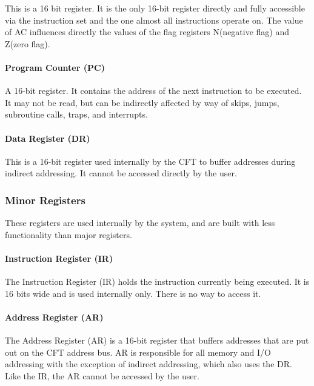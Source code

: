 \documentclass[11pt,a4paper,twocolumns]{article}
\newcommand\register[1]{\textsf{#1}}
\newcommand\A{\register{AC}}
\newcommand\Zreg{\register{Z}}
\newcommand\Nreg{\register{N}}
\newcommand\AR{\register{AR}}
\newcommand\DR{\register{DR}}
\newcommand\PC{\register{PC}}
\newcommand\IR{\register{IR}}
\begin{document}
This is a 16 bit register. It is the only 16-bit register directly and
fully accessible via the instruction set and the one almost all
instructions operate on. The value of \A{} influences directly the
values of the flag registers \Nreg (negative flag) and \Zreg (zero
flag).

\paragraph{Program Counter (\PC)}

A 16-bit register. It contains the address of the next instruction to
be executed. It may not be read, but can be indirectly affected by way
of skips, jumps, subroutine calls, traps, and interrupts.

\paragraph{Data Register (\DR)}

This is a 16-bit register used internally by the CFT to buffer
addresses during indirect addressing. It cannot be accessed directly
by the user.



\subsubsection{Minor Registers}

These registers are used internally by the system, and are built with
less functionality than major registers.

\paragraph{Instruction Register (\IR)}

The Instruction Register (\IR) holds the instruction currently being
executed. It is 16 bits wide and is used internally only. There is no
way to access it.

\paragraph{Address Register (\AR)}

The Address Register (\AR) is a 16-bit register that buffers addresses
that are put out on the CFT address bus. \AR{} is responsible for all
memory and I/O addressing with the exception of indirect addressing,
which also uses the \DR. Like the \IR, the {\AR} cannot be accessed by
the user.
\end{document}

